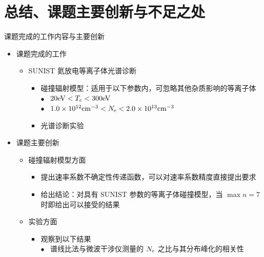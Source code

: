 \section{总结、课题主要创新与不足之处}

\begin{frame}{课题完成的工作内容与主要创新}
	\begin{itemize}
		\item 课题完成的工作
			\begin{itemize}
				\item SUNIST 氦放电等离子体光谱诊断
					\begin{itemize}
						\item 碰撞辐射模型：适用于以下参数内，可忽略其他杂质影响的等离子体\\%
								{\footnotesize
								{\color{bulletcolor}\quad\tiny{}\hbox{{$\bullet$}}}~ $20{\rm eV}<T_e<300{\rm eV}$ \\
								{\color{bulletcolor}\quad\tiny{}\hbox{{$\bullet$}}}~ $1.0\times10^{12}{\rm cm}^{-3}<N_{\rm e}<2.0\times10^{13}{\rm cm}^{-3}$
								}
						\item 光谱诊断实验%
					\end{itemize}
			\end{itemize}
		\bigskip
		\item 课题主要创新
			\begin{itemize}
				\item 碰撞辐射模型方面
					\begin{itemize}
						\item 提出速率系数不确定性传递函数，可以对速率系数精度直接提出要求
						\item 给出结论：对具有 SUNIST 参数的等离子体碰撞模型，当 $\max n=7$ 时即给出可以接受的结果
					\end{itemize}
				\item 实验方面
					\begin{itemize}
						\item 观察到以下结果\\
						{\footnotesize
							{\color{bulletcolor}\quad\tiny{}\hbox{{$\bullet$}}}~ 谱线比法与微波干涉仪测量的 $N_{\rm e}$ 之比与其分布峰化的相关性 \\
}
\end{itemize}
\end{itemize}
\end{itemize}
\end{frame}
